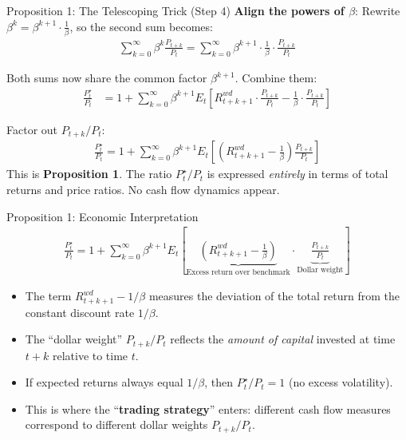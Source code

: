 \documentclass{beamer}
\begin{document}
\begin{frame}{Proposition 1: The Telescoping Trick (Step 4)}
	\textbf{Align the powers of $\beta$}: Rewrite $\beta^k = \beta^{k+1} \cdot \frac{1}{\beta}$, so the second sum becomes:
	\begin{align*}
		\sum_{k=0}^{\infty} \beta^{k} \frac{P_{t+k}}{P_t} = \sum_{k=0}^{\infty} \beta^{k+1} \cdot \frac{1}{\beta} \cdot \frac{P_{t+k}}{P_t}
	\end{align*}

	Both sums now share the common factor $\beta^{k+1}$. Combine them:
	\begin{align*}
		\frac{P_t^\star}{P_t} &= 1 + \sum_{k=0}^{\infty} \beta^{k+1} E_t\!\left[R_{t+k+1}^{wd} \cdot \frac{P_{t+k}}{P_t} - \frac{1}{\beta} \cdot \frac{P_{t+k}}{P_t}\right]
	\end{align*}

	Factor out $P_{t+k}/P_t$:
	\begin{align}
		\boxed{\frac{P_t^\star}{P_t} = 1 + \sum_{k=0}^{\infty} \beta^{k+1} E_t\!\left[\left(R_{t+k+1}^{wd} - \frac{1}{\beta}\right) \frac{P_{t+k}}{P_t}\right]} \label{equ:prop1}
	\end{align}
	This is \textbf{Proposition 1}. The ratio $P_t^\star / P_t$ is expressed \textit{entirely} in terms of total returns and price ratios. No cash flow dynamics appear.
\end{frame}

\begin{frame}{Proposition 1: Economic Interpretation}
	\begin{align*}
		\frac{P_t^\star}{P_t} = 1 + \sum_{k=0}^{\infty} \beta^{k+1} E_t\left[\underbrace{\left(R_{t+k+1}^{wd} - \frac{1}{\beta}\right)}_{\text{Excess return over benchmark}} \cdot \underbrace{\frac{P_{t+k}}{P_t}}_{\text{Dollar weight}}\right]
	\end{align*}

	\begin{itemize}
		\item The term $R_{t+k+1}^{wd} - 1/\beta$ measures the deviation of the total return from the constant discount rate $1/\beta$.
		\item The ``dollar weight'' $P_{t+k}/P_t$ reflects the \textit{amount of capital} invested at time $t+k$ relative to time $t$.
		\item If expected returns always equal $1/\beta$, then $P_t^\star/P_t = 1$ (no excess volatility).
		\item This is where the ``\textbf{trading strategy}'' enters: different cash flow measures correspond to different dollar weights $P_{t+k}/P_t$.
	\end{itemize}
\end{frame}
\end{document}

